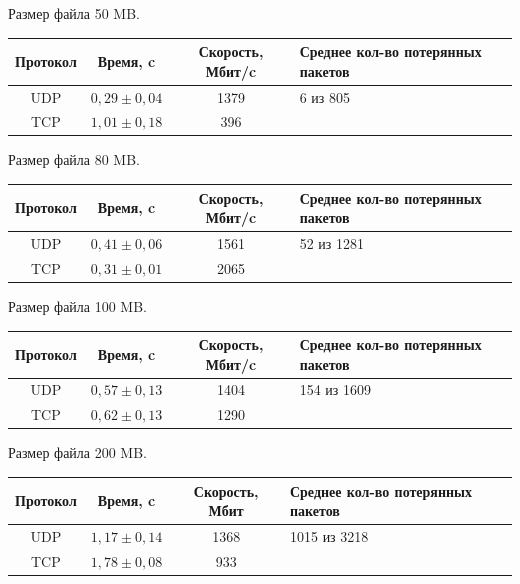 \documentclass{article}
\begin{document}
\newpage

Размер файла 50 MB.

\begin{table}[h!]
\begin{tabular}{|c|c|c|p{130pt}|}
\hline
Протокол & Время, c & Скорость, Мбит/c & Среднее кол-во потерянных пакетов \\
\hline
UDP & $0,29 \pm 0,04$ & 1379 & 6 из 805\\
TCP & $1,01 \pm 0,18$ & 396 &  \\
\hline
\end{tabular}
\end{table}

Размер файла 80 MB.

\begin{table}[h!]
\begin{tabular}{|c|c|c|p{130pt}|}
\hline
Протокол & Время, c & Скорость, Мбит/c & Среднее кол-во потерянных пакетов \\
\hline
UDP & $0,41 \pm 0,06$ & 1561 & 52 из 1281\\
TCP & $0,31 \pm 0,01$ & 2065 &  \\
\hline
\end{tabular}
\end{table}

Размер файла 100 MB.

\begin{table}[h!]
\begin{tabular}{|c|c|c|p{130pt}|}
\hline
Протокол & Время, c & Скорость, Мбит/c & Среднее кол-во потерянных пакетов \\
\hline
UDP & $0,57 \pm 0,13$ & 1404 & 154 из 1609\\
TCP & $0,62 \pm 0,13$ & 1290 &  \\
\hline
\end{tabular}
\end{table}

Размер файла 200 MB.

\begin{table}[h!]
\begin{tabular}{|c|c|c|p{130pt}|}
\hline
Протокол & Время, c & Скорость, Мбит & Среднее кол-во потерянных пакетов \\
\hline
UDP & $1,17 \pm 0,14$ & 1368 & 1015 из 3218\\
TCP & $1,78 \pm 0,08$ & 933 &  \\
\hline
\end{tabular}
\end{table}
\end{document}
